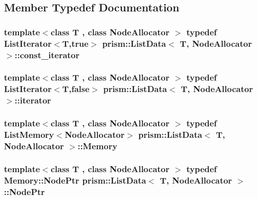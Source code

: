 \subsection{Member Typedef Documentation}
\subsubsection[{\texorpdfstring{const\+\_\+iterator}{const_iterator}}]{\setlength{\rightskip}{0pt plus 5cm}template$<$class T , class Node\+Allocator $>$ typedef {\bf List\+Iterator}$<$T,true$>$ {\bf prism\+::\+List\+Data}$<$ T, Node\+Allocator $>$\+::{\bf const\+\_\+iterator}}\hypertarget{structprism_1_1_list_data_adf50481f89392e64eb3de1fbffd20c63}{}\label{structprism_1_1_list_data_adf50481f89392e64eb3de1fbffd20c63}
\subsubsection[{\texorpdfstring{iterator}{iterator}}]{\setlength{\rightskip}{0pt plus 5cm}template$<$class T , class Node\+Allocator $>$ typedef {\bf List\+Iterator}$<$T,false$>$ {\bf prism\+::\+List\+Data}$<$ T, Node\+Allocator $>$\+::{\bf iterator}}\hypertarget{structprism_1_1_list_data_a4bc53f6312c92f848fe93b2814904cff}{}\label{structprism_1_1_list_data_a4bc53f6312c92f848fe93b2814904cff}
\subsubsection[{\texorpdfstring{Memory}{Memory}}]{\setlength{\rightskip}{0pt plus 5cm}template$<$class T , class Node\+Allocator $>$ typedef {\bf List\+Memory}$<$Node\+Allocator$>$ {\bf prism\+::\+List\+Data}$<$ T, Node\+Allocator $>$\+::{\bf Memory}}\hypertarget{structprism_1_1_list_data_a6d98e28cb4bb0df40d244e1a9ee372a2}{}\label{structprism_1_1_list_data_a6d98e28cb4bb0df40d244e1a9ee372a2}
\subsubsection[{\texorpdfstring{Node\+Ptr}{NodePtr}}]{\setlength{\rightskip}{0pt plus 5cm}template$<$class T , class Node\+Allocator $>$ typedef {\bf Memory\+::\+Node\+Ptr} {\bf prism\+::\+List\+Data}$<$ T, Node\+Allocator $>$\+::{\bf Node\+Ptr}}\hypertarget{structprism_1_1_list_data_a6abedadad0342afa083fed664b90d474}{}\label{structprism_1_1_list_data_a6abedadad0342afa083fed664b90d474}

